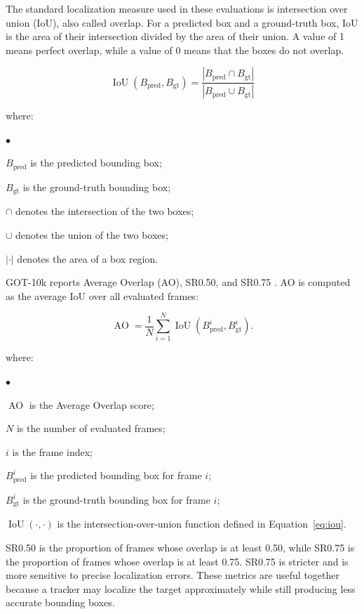 \documentclass[bachelorthesis]{fer}
\numberwithin{equation}{chapter}
\newcommand{\FormulaNotationWith}[2]{%
    \vspace{-0.6em}
    \noindent\hspace*{1.2em}%
    \begin{minipage}{0.90\textwidth}
        \footnotesize
        #1
        \vspace{0.2em}
        \begin{list}{\(\bullet\)}{
            \setlength{\leftmargin}{1.4em}
            \setlength{\labelwidth}{0.8em}
            \setlength{\labelsep}{0.5em}
            \setlength{\itemsep}{0.05em}
            \setlength{\parsep}{0pt}
            \setlength{\topsep}{0.25em}
            \setlength{\partopsep}{0pt}
        }
            #2
        \end{list}
    \end{minipage}
    \par
    \vspace{0.8em}

}
\newcommand{\FormulaNotation}[1]{\FormulaNotationWith{where:}{#1}}
\begin{document}
    The standard localization measure used in these evaluations is intersection over union
    (IoU), also called overlap. For a predicted box and a ground-truth box, IoU is the area
    of their intersection divided by the area of their union. A value of 1 means perfect
    overlap, while a value of 0 means that the boxes do not overlap.

    \begin{equation}
        \operatorname{IoU}(B_{\text{pred}}, B_{\text{gt}})
        =
        \frac{|B_{\text{pred}} \cap B_{\text{gt}}|}
        {|B_{\text{pred}} \cup B_{\text{gt}}|}
        \label{eq:iou}
    \end{equation}
    \FormulaNotation{
        \item \(B_{\text{pred}}\) is the predicted bounding box;
        \item \(B_{\text{gt}}\) is the ground-truth bounding box;
        \item \(\cap\) denotes the intersection of the two boxes;
        \item \(\cup\) denotes the union of the two boxes;
        \item \(|\cdot|\) denotes the area of a box region.
    }

    GOT-10k reports Average Overlap (AO), SR0.50, and SR0.75 \cite{huang2021got10k}. AO is computed
    as the average IoU over all evaluated frames:

    \begin{equation}
        \operatorname{AO}
        =
        \frac{1}{N}
        \sum_{i=1}^{N}
        \operatorname{IoU}(B^{i}_{\text{pred}}, B^{i}_{\text{gt}}).
    \end{equation}
    \FormulaNotation{
        \item \(\operatorname{AO}\) is the Average Overlap score;
        \item \(N\) is the number of evaluated frames;
        \item \(i\) is the frame index;
        \item \(B^{i}_{\text{pred}}\) is the predicted bounding box for frame \(i\);
        \item \(B^{i}_{\text{gt}}\) is the ground-truth bounding box for frame \(i\);
        \item \(\operatorname{IoU}(\cdot,\cdot)\) is the intersection-over-union function defined in Equation~\eqref{eq:iou}.
    }

    SR0.50 is the proportion of frames whose overlap is at least 0.50, while SR0.75 is the
    proportion of frames whose overlap is at least 0.75. SR0.75 is stricter and is more
    sensitive to precise localization errors. These metrics are useful together because a
    tracker may localize the target approximately while still producing less accurate
    bounding boxes.
\end{document}

